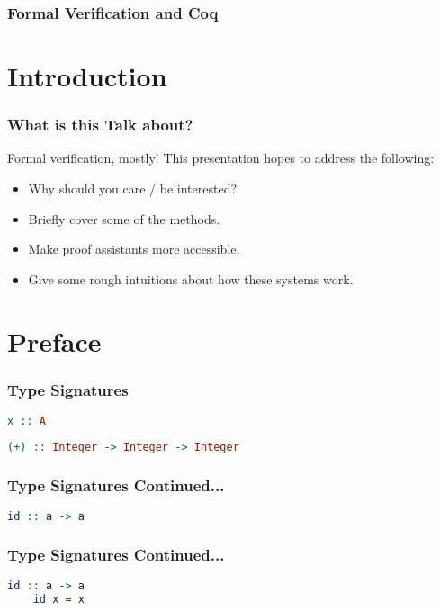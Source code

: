 \documentclass{beamer}
\author{
  Beck, Calvin\\
  \email{hobbes@ualberta.ca}
}
\begin{document}
\begin{frame}
  \frametitle{Formal Verification and Coq}
  \maketitle
\end{frame}

\section{Introduction}

\begin{frame}
  \frametitle{What is this Talk about?}

  Formal verification, mostly! This presentation hopes to address the following:

  \begin{itemize}
  \item Why should you care / be interested?
  \item Briefly cover some of the methods.
  \item Make proof assistants more accessible.
  \item Give some rough intuitions about how these systems work.
  \end{itemize}
\end{frame}


\section{Preface}

\begin{frame}[fragile]
  \frametitle{Type Signatures}

    \begin{lstlisting}[frame=single, language=Haskell, breaklines=true]
      x :: A
    \end{lstlisting}

    \begin{lstlisting}[frame=single, language=Haskell, breaklines=true]
      (+) :: Integer -> Integer -> Integer
    \end{lstlisting}
\end{frame}

\begin{frame}[fragile]
  \frametitle{Type Signatures Continued...}

  \begin{lstlisting}[frame=single, language=Haskell, breaklines=true]
    id :: a -> a
  \end{lstlisting}
\end{frame}


\begin{frame}[fragile]
  \frametitle{Type Signatures Continued...}

  \begin{lstlisting}[frame=single, language=Haskell, breaklines=true]
    id :: a -> a
    id x = x
  \end{lstlisting}
\end{frame}
\end{document}
